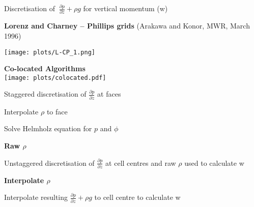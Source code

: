 \begin{slide}{Discretisation of $~\frac{\partial p}{\partial z} + \rho g$ for vertical momentum (w)}

\vspace{12pt}
\begin{minipage}{0.49\linewidth}\raggedright
\begin{center}{\bf Lorenz and Charney -- Phillips grids} (Arakawa and Konor, MWR, March 1996) \end{center}
\texttt{[image: plots/L-CP\_1.png]}
\end{minipage}
%
\begin{minipage}{0.49\linewidth}\begin{center}
{\bf Co-located Algorithms} \\
\texttt{[image: plots/colocated.pdf]} \\
\vspace{12pt}
\begin{list0}
\item Staggered discretisation of $\frac{\partial p}{\partial z}$ at faces
\item Interpolate $\rho$ to face
\item Solve Helmholz equation for $p$ and $\phi$
\end{list0}
\begin{minipage}[t]{0.49\linewidth}\raggedright
\begin{center}{\bf Raw $\rho$ }\end{center}
\begin{list0}
\item Unstaggered discretisation of $\frac{\partial p}{\partial z}$ at cell centres and raw $\rho$ used to calculate w
\end{list0}
\end{minipage}
%
\begin{minipage}[t]{0.49\linewidth}\raggedright
\begin{center}{\bf Interpolate $\rho$ }\end{center}
\begin{list0}
\item Interpolate resulting $\frac{\partial p}{\partial z} + \rho g$ to cell centre to calculate w
\end{list0}
\end{minipage}
\end{center}
\end{minipage}
\end{slide}

